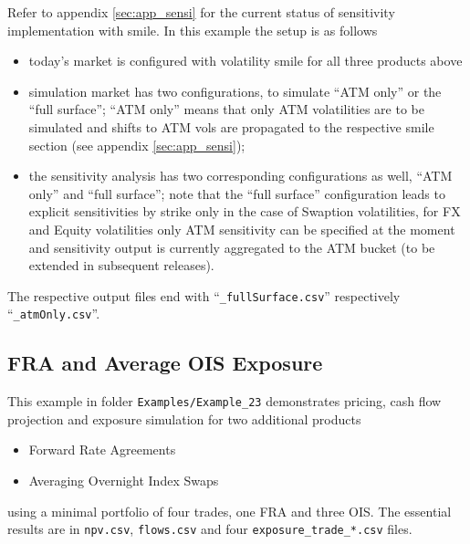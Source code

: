 \documentclass[12pt, a4paper]{article}
\begin{document}
\medskip
Refer to appendix \ref{sec:app_sensi} for the current status of sensitivity implementation with smile. In this example the setup is as follows
\begin{itemize}
\item today's market is configured with volatility smile for all three products above
\item simulation market has two configurations, to simulate ``ATM only'' or the ``full surface''; ``ATM only'' means that only ATM volatilities are to be simulated and shifts to ATM vols are propagated to the respective smile section (see appendix \ref{sec:app_sensi});  
\item the sensitivity analysis has two corresponding configurations as well, ``ATM only'' and ``full surface''; note that the ``full surface'' configuration leads to explicit sensitivities by strike only in the case of Swaption volatilities, for FX and Equity volatilities only ATM sensitivity can be specified at the moment and sensitivity output is currently aggregated to the ATM bucket (to be extended in subsequent releases).
\end{itemize}

The respective output files end with ``{\tt\_fullSurface.csv}'' respectively ``{\tt\_atmOnly.csv}''.



\subsection{FRA and Average OIS Exposure}%

This example in folder {\tt Examples/Example\_23} demonstrates pricing, cash flow projection and exposure simulation for two additional products
\begin{itemize}
\item Forward Rate Agreements
\item Averaging Overnight Index Swaps
\end{itemize}
using a minimal portfolio of four trades, one FRA and three OIS. The essential results are in {\tt npv.csv}, {\tt flows.csv} and 
four {\tt exposure\_trade\_*.csv} files.
\end{document}
